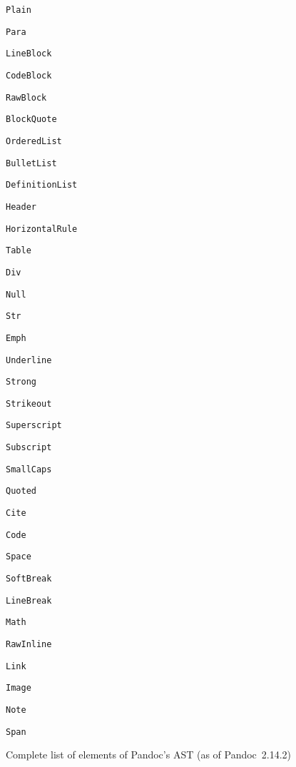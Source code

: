 \documentclass[
  digital,     %
  oneside,     %
  nosansbold,  %
  nocolorbold, %
  lof,         %
  lot,         %
]{fithesis4}
\begin{document}
\begin{figure}
  \centering
  \begin{multicols}{3}
    \begin{compactenum}
      \item \texttt{Plain}
      \item \texttt{Para}
      \item \texttt{LineBlock}
      \item \texttt{CodeBlock}
      \item \texttt{RawBlock}
      \item \texttt{BlockQuote}
      \item \texttt{OrderedList}
      \item \texttt{BulletList}
      \item \texttt{DefinitionList}
      \item \texttt{Header}
      \item \texttt{HorizontalRule}
      \item \texttt{Table}
      \item \texttt{Div}
      \item \texttt{Null}
      \item \texttt{Str}
      \item \texttt{Emph}
      \item \texttt{Underline}
      \item \texttt{Strong}
      \item \texttt{Strikeout}
      \item \texttt{Superscript}
      \item \texttt{Subscript}
      \item \texttt{SmallCaps}
      \item \texttt{Quoted}
      \item \texttt{Cite}
      \item \texttt{Code}
      \item \texttt{Space}
      \item \texttt{SoftBreak}
      \item \texttt{LineBreak}
      \item \texttt{Math}
      \item \texttt{RawInline}
      \item \texttt{Link}
      \item \texttt{Image}
      \item \texttt{Note}
      \item \texttt{Span}
    \end{compactenum}
  \end{multicols}
  \vspace*{-1em}
  \caption{Complete list of elements of Pandoc's AST (as of Pandoc~2.14.2)}
  \label{fig:pandoc-elems}
\end{figure}
\end{document}
